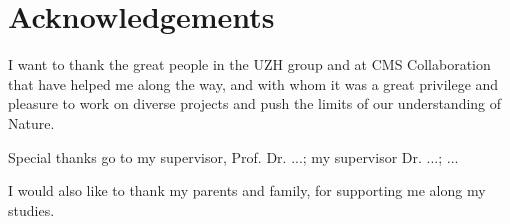 {}
\chapter*{Acknowledgements}

I want to thank the great people in the UZH group and at CMS Collaboration that have helped me along the way, and with whom it was a great privilege and pleasure to work on diverse projects and push the limits of our understanding of Nature.

Special thanks go to my supervisor, Prof. Dr. ...; my supervisor Dr. ...; ...

I would also like to thank my parents and family, for supporting me along my studies.

\newpage